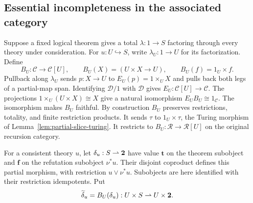 \subsection{Essential incompleteness in the associated category}\label{subsec:essential-incompleteness-slice}

Suppose a fixed logical theorem gives a total $\lambda:1\to S$
factoring through every theory under consideration. For
$u:U\hookrightarrow S$, write $\lambda_U:1\to U$ for its factorization.
Define
\[
 B_U:\mathscr C\to\mathscr C[U],\qquad
 B_U(X)=(U\times X\to U),\qquad B_U(f)=1_U\times f.
\]
Pullback along $\lambda_U$ sends $p:X\to U$ to
$E_U(p)=1\times_U X$ and pulls back both legs of a partial-map span.
Identifying $\mathcal D/1$ with $\mathcal D$ gives
$E_U:\mathscr C[U]\to\mathscr C$. The projections
$1\times_U(U\times X)\cong X$ give a natural isomorphism
$E_UB_U\cong1_{\mathscr C}$.
The isomorphism makes $B_U$ faithful. By construction $B_U$ preserves
restrictions, totality, and finite restriction products. It sends $\tau$ to $1_U\times\tau$, the Turing morphism
of Lemma~\ref{lem:partial-slice-turing}. It restricts to
$B_U:\mathscr R\to\mathscr R[U]$ on the original recursion category.

For a consistent theory $u$, let $\delta_u:S\rightharpoonup\mathbf 2$
have value $\mathbf t$ on the theorem subobject and $\mathbf f$ on
the refutation subobject $\nu^*u$. Their disjoint coproduct defines
this partial morphism, with restriction $u\vee\nu^*u$.
Subobjects are here identified with their restriction idempotents.
Put
\[
 \widetilde\delta_u=B_U(\delta_u):
 U\times S\rightharpoonup U\times\mathbf 2.
\]

